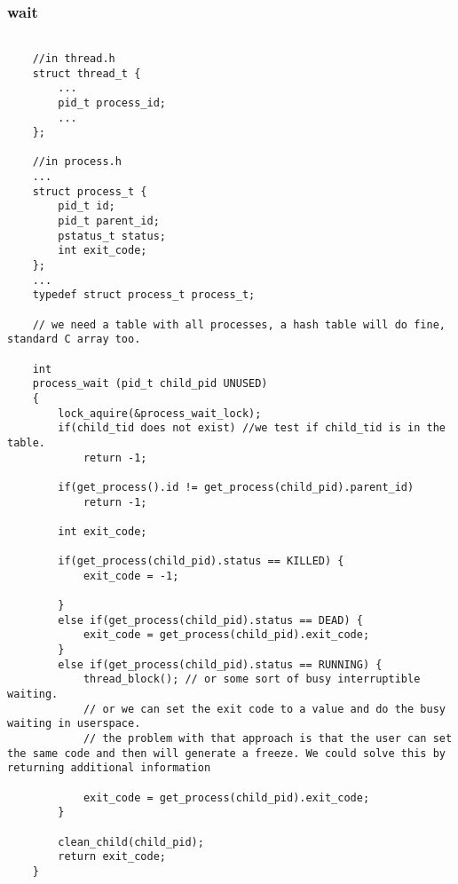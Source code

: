 {    \subsubsection{wait}
    \begin{lstlisting}

    //in thread.h
    struct thread_t {
        ...
        pid_t process_id;
        ...
    };

    //in process.h
    ...
    struct process_t {
        pid_t id;
        pid_t parent_id;
        pstatus_t status;        
        int exit_code;
    };
    ...
    typedef struct process_t process_t;

    // we need a table with all processes, a hash table will do fine, standard C array too.

    int
    process_wait (pid_t child_pid UNUSED) 
    {
        lock_aquire(&process_wait_lock);
        if(child_tid does not exist) //we test if child_tid is in the table.
            return -1;

        if(get_process().id != get_process(child_pid).parent_id)
            return -1;

        int exit_code;

        if(get_process(child_pid).status == KILLED) {
            exit_code = -1;
            
        }
        else if(get_process(child_pid).status == DEAD) {
            exit_code = get_process(child_pid).exit_code;            
        }
        else if(get_process(child_pid).status == RUNNING) {
            thread_block(); // or some sort of busy interruptible waiting.
            // or we can set the exit code to a value and do the busy waiting in userspace.
            // the problem with that approach is that the user can set the same code and then will generate a freeze. We could solve this by returning additional information

            exit_code = get_process(child_pid).exit_code;
        }

        clean_child(child_pid);
        return exit_code;
    }

    
    \end{lstlisting}





}
